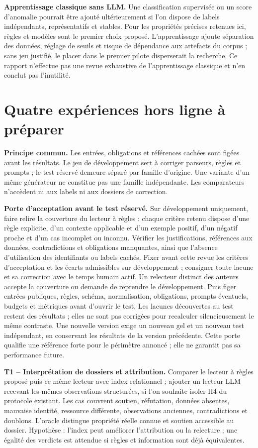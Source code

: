 \documentclass[11pt,a4paper]{article}
\begin{document}
\textbf{Apprentissage classique sans LLM.} Une classification supervisée ou
un score d'anomalie pourrait être ajouté ultérieurement si l'on dispose de
labels indépendants, représentatifs et stables. Pour les propriétés précises
retenues ici, règles et modèles sont le premier choix proposé. L'apprentissage
ajoute séparation des données, réglage de seuils et risque de dépendance aux
artefacts du corpus ; sans jeu justifié, le placer dans le premier pilote
disperserait la recherche. Ce rapport n'effectue pas une revue exhaustive de
l'apprentissage classique et n'en conclut pas l'inutilité.

\section{Quatre expériences hors ligne à préparer}
\textbf{Principe commun.} Les entrées, obligations et références cachées sont
figées avant les résultats. Le jeu de développement sert à corriger parseurs,
règles et prompts ; le test réservé demeure séparé par famille d'origine.
Une variante d'un même générateur ne constitue pas une famille indépendante.
Les comparateurs n'accèdent ni aux labels ni aux dossiers de correction.

\textbf{Porte d'acceptation avant le test réservé.} Sur développement uniquement,
faire relire la couverture du lecteur à règles : chaque critère retenu dispose
d'une règle explicite, d'un contexte applicable et d'un exemple positif, d'un
négatif proche et d'un cas incomplet ou inconnu. Vérifier les justifications,
références aux données, contradictions et obligations manquantes, ainsi que
l'absence d'utilisation des identifiants ou labels cachés. Fixer avant cette
revue les critères d'acceptation et les écarts admissibles sur développement ;
consigner toute lacune et sa correction avec le temps humain actif. Un relecteur
distinct des auteurs accepte la couverture ou demande de reprendre le
développement. Puis figer entrées publiques, règles, schéma, normalisation,
obligations, prompts éventuels, budgets et métriques avant d'ouvrir le test.
Les lacunes découvertes au test restent des résultats ; elles ne sont pas
corrigées pour recalculer silencieusement le même contraste. Une nouvelle
version exige un nouveau gel et un nouveau test indépendant, en conservant
les résultats de la version précédente. Cette porte qualifie une référence
forte pour le périmètre annoncé ; elle ne garantit pas sa performance future.

\textbf{T1 -- Interprétation de dossiers et attribution.} Comparer le lecteur
à règles proposé puis ce même lecteur avec index relationnel ; ajouter un
lecteur LLM recevant les mêmes
observations structurées, si l'on souhaite isoler H4 du protocole existant.
Les cas couvrent soutien, réfutation, données absentes, mauvaise identité,
ressource différente, observations anciennes, contradictions et doublons.
L'oracle distingue propriété réelle connue et soutien accessible au dossier.
Hypothèse : l'index peut améliorer l'attribution ou la relecture ; une égalité
des verdicts est attendue si règles et information sont déjà équivalentes.
\end{document}
